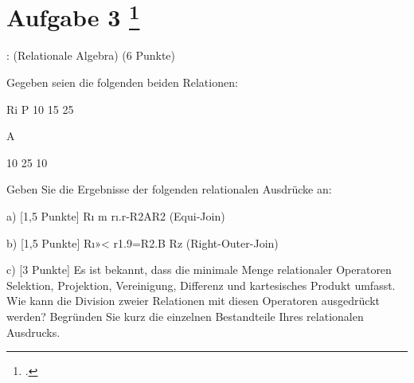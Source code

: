 \documentclass{lehramt-informatik-aufgabe}
\begin{document}
\liAufgabenTitel{}
\section{Aufgabe 3
\footcite{examen:66116:2019:09}}

: (Relationale Algebra) (6 Punkte)

Gegeben seien die folgenden beiden Relationen:

Ri P
10
15
25

A

10
25
10

Geben Sie die Ergebnisse der folgenden relationalen Ausdrücke an:

a) [1,5 Punkte] Rı m rı.r-R2AR2 (Equi-Join)

b) [1,5 Punkte] Rı»< r1.9=R2.B Rz (Right-Outer-Join)

c) [3 Punkte] Es ist bekannt, dass die minimale Menge relationaler Operatoren Selektion, Projektion,
Vereinigung, Differenz und kartesisches Produkt umfasst. Wie kann die Division zweier
Relationen mit diesen Operatoren ausgedrückt werden? Begründen Sie kurz die einzelnen
Bestandteile Ihres relationalen Ausdrucks.
\end{document}
